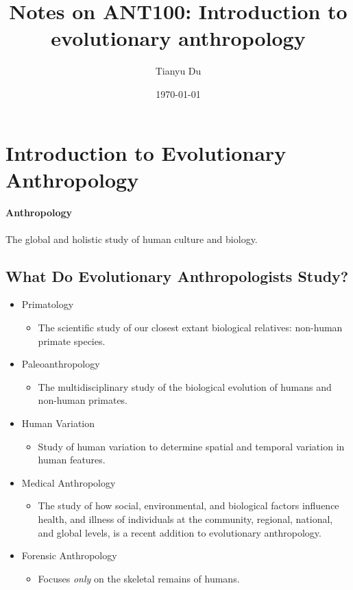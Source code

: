 \documentclass{article}
\date{\today}
\author{Tianyu Du}
\title{Notes on ANT100: Introduction to evolutionary anthropology}
\begin{document}
	\maketitle
	\tableofcontents
	\section{Introduction to Evolutionary Anthropology}
	\paragraph{Anthropology} The global and holistic study of human culture and biology.
	\subsection{What Do Evolutionary Anthropologists Study?}
	\begin{itemize}
		\item Primatology
			\begin{itemize}
				\item The scientific study of our closest extant biological relatives: non-human primate species.
			\end{itemize}
		\item Paleoanthropology
			\begin{itemize}
				\item The multidisciplinary study of the biological evolution of humans and non-human primates.
			\end{itemize}
		\item Human Variation
			\begin{itemize}
				\item Study of human variation to determine spatial and temporal variation in human features.
			\end{itemize}
		\item Medical Anthropology
			\begin{itemize}
				\item The study of how social, environmental, and biological factors influence health, and illness of individuals at the community, regional, national, and global levels, is a recent addition to evolutionary anthropology.
			\end{itemize}
		\item Forensic Anthropology
			\begin{itemize}
				\item Focuses \emph{only} on the skeletal remains of humans.
			\end{itemize}
	\end{itemize}
\end{document}
